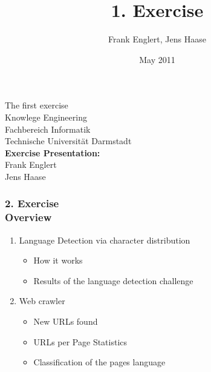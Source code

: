 \documentclass[accentcolor=tud1b,colorbacktitle,inverttitle,landscape,presentation,t]{tudbeamer}
\newcommand{\myframetitle}[2]{\frametitle{#1 \\[.2cm] \small #2}}
\begin{document}
\title[MGA]{\large 1. Exercise}

\author{Frank Englert, Jens Haase}


\date{May 2011}

\begin{titleframe}
\begin{center}
\color{tudtextaccent} \large The first exercise\\[.5cm]
\normalcolor \normalsize Knowlege Engineering \\
Fachbereich Informatik \\
Technische Universität Darmstadt\\[.5cm]

\textbf{Exercise Presentation:}\\
Frank Englert\\
Jens Haase
\end{center}

\end{titleframe} 

\begin{frame}[c]
	\myframetitle{2. Exercise}{Overview}
\begin{enumerate}
  \item Language Detection via character distribution
  \begin{itemize}
  \item How it works
  \item Results of the language detection challenge
\end{itemize}
  \item Web crawler
  \begin{itemize}
  \item New URLs found
  \item URLs per Page Statistics
  \item Classification of the pages language
\end{itemize}
\end{enumerate}
\end{frame}



\end{document}

